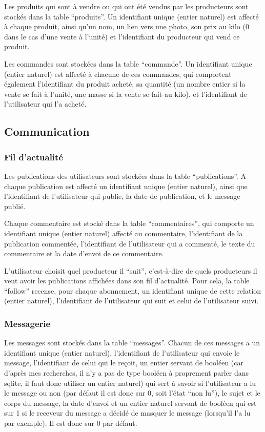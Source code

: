\documentclass{article}
\begin{document}
Les produits qui sont à vendre ou qui ont été vendus par les producteurs sont stockés dans la table “produits”. Un identifiant unique (entier naturel) est affecté à chaque produit, ainsi qu’un nom, un lien vers une photo, son prix au kilo (0 dans le cas d’une vente à l’unité) et l’identifiant du producteur qui vend ce produit.

Les commandes sont stockées dans la table “commande”. Un identifiant unique (entier naturel) est affecté à chacune de ces commandes, qui comportent également l’identifiant du produit acheté, sa quantité (un nombre entier si la vente se fait à l’unité, une masse si la vente se fait au kilo), et l’identifiant de l’utilisateur qui l’a acheté.

\subsection{Communication}

\subsubsection{\color{red}Fil d’actualité}

Les publications des utilisateurs sont stockées dans la table “publications”. A chaque publication est affecté un identifiant unique (entier naturel), ainsi que l’identifiant de l’utilisateur qui publie, la date de publication, et le message publié.

Chaque commentaire est stocké dans la table “commentaires”, qui comporte un identifiant unique (entier naturel) affecté au commentaire, l’identifiant de la publication commentée, l’identifiant de l’utilisateur qui a commenté, le texte du commentaire et la date d’envoi de ce commentaire.

L’utilisateur choisit quel producteur il “suit”, c’est-à-dire de quels producteurs il veut avoir les publications affichées dans son fil d’actualité. Pour cela, la table “follow” recense, pour chaque abonnement, un identifiant unique de cette relation (entier naturel), l’identifiant de l’utilisateur qui suit et celui de l’utilisateur suivi.

\subsubsection{\color{violet}Messagerie}

Les messages sont stockés dans la table “messages”. Chacun de ces messages a un identifiant unique (entier naturel), l’identifiant de l’utilisateur qui envoie le message, l’identifiant de celui qui le reçoit, un entier servant de booléen (car d’après mes recherches, il n’y a pas de type booléen à proprement parler dans sqlite, il faut donc utiliser un entier naturel) qui sert à savoir si l’utilisateur a lu le message ou non (par défaut il est donc sur 0, soit l’état “non lu”), le sujet et le corps du message, la date d’envoi et un entier naturel servant de booléen qui est sur 1 si le receveur du message a décidé de masquer le message (lorsqu’il l’a lu par exemple). Il est donc sur 0 par défaut. 
\end{document}
